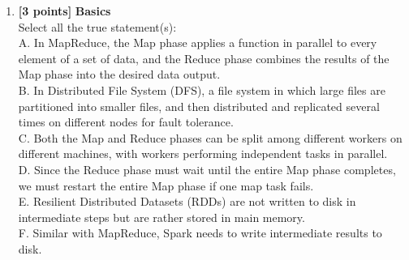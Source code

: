 \documentclass[10pt]{article}
\begin{document}
\begin{enumerate}

	\item \textbf{[3 points]} \textbf{Basics} \\
	      Select all the true statement(s): \\
	      A. In MapReduce, the Map phase applies a function in parallel to every element of a set of data, and the Reduce phase combines the
	      results of the Map phase into the desired data output. \\
	      B. In Distributed File System (DFS), a file system in which large files are partitioned into smaller files,
	      and then distributed and replicated several times on different nodes for fault tolerance. \\
	      C. Both the Map and Reduce phases can be split among different
	      workers on different machines, with workers performing independent tasks in parallel. \\
	      D. Since the Reduce phase must wait until the entire Map phase completes, we must restart the entire Map phase if one map task
	      fails. \\
	      E. Resilient Distributed Datasets (RDDs) are not written to disk in intermediate steps but are rather stored in main memory. \\
	      F. Similar with MapReduce, Spark needs to write intermediate results to disk. \\


\end{enumerate}
\end{document}
